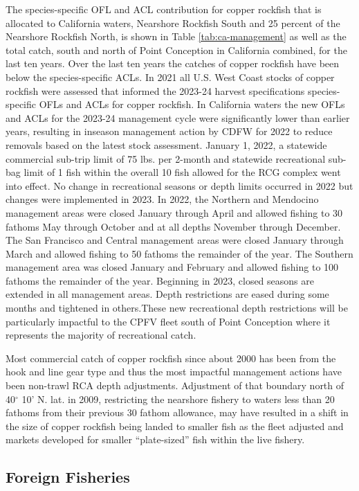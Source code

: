 \documentclass[11pt,
  letterpaper,
]{article}
\begin{document}
The species-specific OFL and ACL contribution for copper rockfish that is allocated to California waters, Nearshore Rockfish South and 25 percent of the Nearshore Rockfish North, is shown in Table \ref{tab:ca-management} as well as the total catch, south and north of Point Conception in California combined, for the last ten years. Over the last ten years the catches of copper rockfish have been below the species-specific ACLs. In 2021 all U.S. West Coast stocks of copper rockfish were assessed that informed the 2023-24 harvest specifications species-specific OFLs and ACLs for copper rockfish. In California waters the new OFLs and ACLs for the 2023-24 management cycle were significantly lower than earlier years, resulting in inseason management action by CDFW for 2022 to reduce removals based on the latest stock assessment. January 1, 2022, a statewide commercial sub-trip limit of 75 lbs. per 2-month and statewide recreational sub-bag limit of 1 fish within the overall 10 fish allowed for the RCG complex went into effect. No change in recreational seasons or depth limits occurred in 2022 but changes were implemented in 2023. In 2022, the Northern and Mendocino management areas were closed January through April and allowed fishing to 30 fathoms May through October and at all depths November through December. The San Francisco and Central management areas were closed January through March and allowed fishing to 50 fathoms the remainder of the year. The Southern management area was closed January and February and allowed fishing to 100 fathoms the remainder of the year. Beginning in 2023, closed seasons are extended in all management areas. Depth restrictions are eased during some months and tightened in others.These new recreational depth restrictions will be particularly impactful to the CPFV fleet south of Point Conception where it represents the majority of recreational catch.

Most commercial catch of copper rockfish since about 2000 has been from the hook and line gear type and thus the most impactful management actions have been non-trawl RCA depth adjustments. Adjustment of that boundary north of 40\(^\circ\) 10' N. lat. in 2009, restricting the nearshore fishery to waters less than 20 fathoms from their previous 30 fathom allowance, may have resulted in a shift in the size of copper rockfish being landed to smaller fish as the fleet adjusted and markets developed for smaller ``plate-sized'' fish within the live fishery.

\subsection{Foreign Fisheries}\label{foreign-fisheries}
\end{document}

